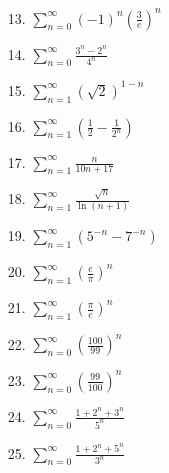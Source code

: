\documentclass[oneside,a4paper,12pt]{article}
\begin{document}
\begin{multicols}{2}
\begin{itemize}
\end{itemize}
\begin{itemize}
	\item [13.] $\sum_{n=0}^{\infty}(-1)^{n}(\frac{3}{e})^{n}$
\end{itemize}
\begin{itemize}
	\item [14.] $\sum_{n=0}^{\infty}\frac{3^{n}-2^{n}}{4^{n}}$
\end{itemize}
\begin{itemize}
	\item [15.] $\sum_{n=1}^{\infty}(\sqrt{2})^{1-n}$
\end{itemize}
\begin{itemize}
	\item [16.] $\sum_{n=1}^{\infty}(\frac{1}{2}-\frac{1}{2^{n}})$
\end{itemize}
\begin{itemize}
	\item [17.] $\sum_{n=1}^{\infty}\frac{n}{10n+17}$
\end{itemize}
\begin{itemize}	
	\item [18.] $\sum_{n=1}^{\infty}\frac{\sqrt{n}}{\ln (n+1)}$
\end{itemize}
\begin{itemize}
	\item [19.] $\sum_{n=1}^{\infty}(5^{-n}-7^{-n})$
\end{itemize}
\begin{itemize}
	\item [20.] $\sum_{n=1}^{\infty}(\frac{e}{\pi})^{n}$
\end{itemize}
\begin{itemize}
	\item [21.] $\sum_{n=1}^{\infty}(\frac{\pi}{e})^{n} $
\end{itemize}
\begin{itemize}
	\item [22.] $\sum_{n=0}^{\infty}(\frac{100}{99})^{n}$
\end{itemize}
\begin{itemize}
	\item [23.] $\sum_{n=0}^{\infty}(\frac{99}{100})^{n}$
\end{itemize}	
\begin{itemize}
	\item [24.] $\sum_{n=0}^{\infty}\frac{1+2^{n}+3^{n}}{5^{n}}$
\end{itemize}
\begin{itemize}
	\item [25.] $\sum_{n=0}^{\infty} \frac{1+2^{n}+5^{n}}{3^{n}}$

\end{itemize}
\end{multicols}
\end{document}
